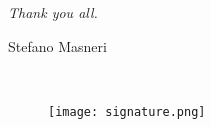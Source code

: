\begin{acknowledgementslong}
\begin{flushright}

\textit{Thank you all.}

Stefano Masneri

\monthname \ \the\year



\begin{figure}[htbp!]
\hfill\begin{minipage}{.5\textwidth}\centering
\texttt{[image: signature.png]}
\end{minipage}
\end{figure}
%



\end{flushright}



\end{acknowledgementslong}

